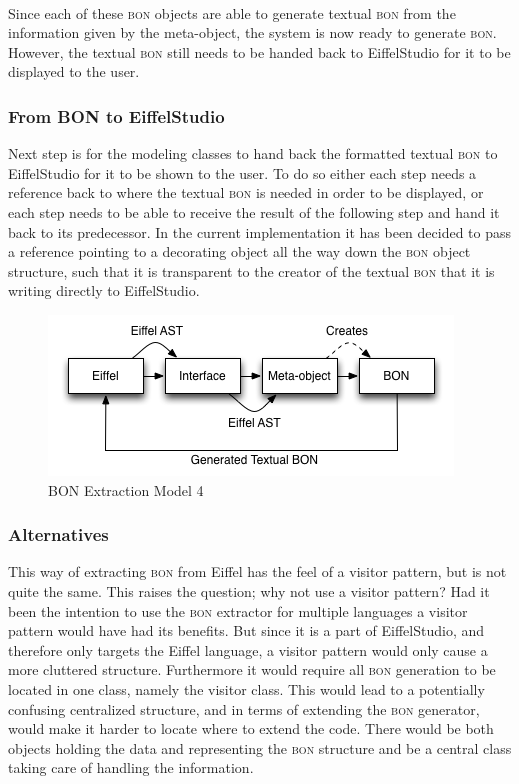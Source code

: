 \paragraph{}
Since each of these \textsc{bon} objects are able to generate textual \textsc{bon} from the information given by the meta-object, the system is now ready to generate \textsc{bon}. However, the textual \textsc{bon} still needs to be handed back to EiffelStudio for it to be displayed to the user.

\subsubsection{From BON to EiffelStudio}
Next step is for the modeling classes to hand back the formatted textual \textsc{bon} to EiffelStudio for it to be shown to the user. To do so either each step needs a reference back to where the textual \textsc{bon} is needed in order to be displayed, or each step needs to be able to receive the result of the following step and hand it back to its predecessor. In the current implementation it has been decided to pass a reference pointing to a decorating object all the way down the \textsc{bon} object structure, such that it is transparent to the creator of the textual \textsc{bon} that it is writing directly to EiffelStudio.

\begin{figure}[H]
\centering
\includegraphics[scale=0.8]{images/BON-extraction-model-4.png}
\caption{BON Extraction Model 4}
\label{fig:bon_extraction_4}
\end{figure}

\subsubsection{Alternatives}
This way of extracting \textsc{bon} from Eiffel has the feel of a visitor pattern, but is not quite the same. This raises the question; why not use a visitor pattern? Had it been the intention to use the \textsc{bon} extractor for multiple languages a visitor pattern would have had its benefits. But since it is a part of EiffelStudio, and therefore only targets the Eiffel language, a visitor pattern would only cause a more cluttered structure. Furthermore it would require all \textsc{bon} generation to be located in one class, namely the visitor class. This would lead to a potentially confusing centralized structure, and in terms of extending the \textsc{bon} generator, would make it harder to locate where to extend the code. There would be both objects holding the data and representing the \textsc{bon} structure and be a central class taking care of handling the information.
